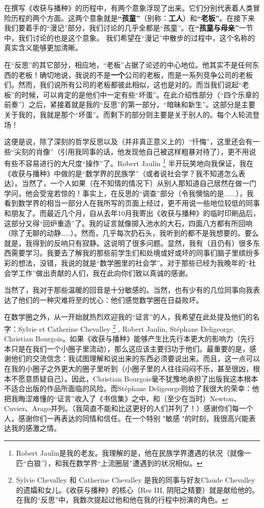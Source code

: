 \documentclass[UTF8, b5paper]{book}
\begin{document}
在撰写《收获与播种》的历程中，有两个意象浮现了出来。它们分别代表着人类冒险历程的两个方面。这两个意象就是\textbf{“孩童”}（别称：\textbf{工人}）和\textbf{“老板”}。在接下来我们要着手的“漫记”部分，我们讨论的几乎全都是“孩童”。在\textbf{“孩童与母亲”}一节中，我们讨论的也是这个意象。 我们希望在“漫记”中散步的过程中，这个名称的真实含义能够更加清晰。\par 
在“反思”的其它部分，相应地，“老板”占据了论述的中心地位。他其实不是任何东西的老板！确切地说，我说的不是\textbf{一个}公司的老板，而是一系列竞争公司的老板们。然而，我们说所有公司的老板都彼此相似，这也是对的。而当我们说起“老板”的时候，可以肯定的是他们中一定有些“坏蛋”。在此介绍性部分（“四个乐章的前奏”）之后，紧接着就是我的“反思”的第一部分，“暗昧和新生”。这部分是主要关于我的，我就是那个“坏蛋”。而剩下的部分则主要是关于别人的。每个人轮流登场！\par 
这便是说，除了深刻的哲学反思以及（并非真正意义上的）“忏悔”，这里还会有一些“尖刻的肖像”（引用我同事的话，他发现他自己被这样粗暴对待了），更不用说有些不容易进行的大尺度“操作”了。Robert Jaulin \footnote{Robert Jaulin是我的老友。我理解的是，他在民族学界遭遇的状况（就像一匹“白狼”），和我在数学界“上流圈层”遭遇到的状况相似。} 半开玩笑地向我保证，我在《收获与播种》中做的是“数学界的民族学”（或者说社会学？我不知道怎么表达）。当然了，一个人如果（在不知情的情况下）从别人那知道自己居然在做一门学问，他会受宠若惊的！事实上，在反思的“调查”部分（令我懊恼的是......），我看到数学界的相当一部分人在我所写的页面上经过，更不用说一些地位较低的同事和朋友了。而最近几个月，自从去年10月我寄出《收获与播种》的临时印刷品后，这部分又得“回炉重造”了。我的证言就像掷入池水的大石，四面八方都有所回响（除了无聊的动静……）。然而，几乎每次扔石头，我听到的都不是我想要的。要么就是，我得到的反响只有寂静。这说明了很多问题。显然，我有（且仍有）很多东西需要学习。我要去了解我的那些前学生们和处境或好或坏的同事们脑子里缤纷多彩的想法，没错，我说的就是“数学圈里的社会学”。对于那些已经为我晚年的“社会学工作”做出贡献的人们，我在此向你们致以真诚的感谢。\par 
当然了，我对于那些温暖的回音是十分敏感的。当然，也有少有的几位同事向我表达了他们的一种灾难将至的忧心：他们感觉数学圈在日益败坏。\par 
在数学圈之外，从一开始就热烈欢迎我的“证言”的人，我希望在此处提及他们的名字：Sylvie et Catherine Chevalley \footnote{Sylvie Chevalley 和 Catherine Chevalley 是我的同事与好友Claude Chevalley的遗孀和女儿。《收获与播种》的核心（Res III, 阴阳之精要）就是献给他的。在我的“反思”中，我数次提起过他和他在我的行程中扮演的角色。} , Robert Jaulin, Stéphane Deligeorge, Christian Bourgois。如果《收获与播种》能够产生比先行本更大的影响力（先行本只是在我们一个小圈子里流动），那么这应该主要归功于他们。最重要的是，感谢他们的交流信念：我试图理解和说出来的东西必须要说出来。而且，这一点可以在我的小圈子之外更大的圈子里听到（小圈子里的人往往闷闷不乐，甚至很凶，根本不愿意质疑自己）。因此，Christian Bourgois毫不犹豫地承担了出版我这本根本不适合出版的作品所面临的风险。而Stéphane Deligeorge则给了我很大的荣幸：他把我晦涩难懂的“证言”收入了《书信集》之中，和（至少在当时）Newton、Cuvier、Arago并列。（我简直不能和比这更好的人们并列了！）感谢你们每一个人，感谢你们一再表达的同情和信任。在一个特别 "敏感 "的时刻，我很高兴能表达我的感激之情。\par 
\end{document}

